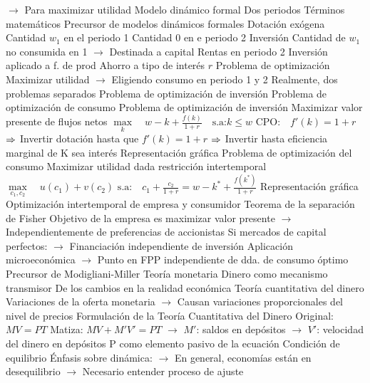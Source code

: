 \documentclass{nuevotema}
\begin{document}
\begin{esquemal}
				\4[] $\to$ Para maximizar utilidad
				\4 Modelo dinámico formal
				\4[] Dos periodos
				\4[] Términos matemáticos
				\4 Precursor de modelos dinámicos formales
				\4 Dotación exógena
				\4[] Cantidad $w_1$ en el periodo 1
				\4[] Cantidad 0 en e periodo 2
				\4 Inversión
				\4[] Cantidad de $w_1$ no consumida en 1
				\4[] $\to$ Destinada a capital
				\4 Rentas en periodo 2
				\4[] Inversión aplicado a f. de prod
				\4[] Ahorro a tipo de interés $r$
				\4 Problema de optimización
				\4[] Maximizar utilidad
				\4[] $\to$ Eligiendo consumo en periodo 1 y 2
				\4 Realmente, dos problemas separados
				\4[I] Problema de optimización de inversión
				\4[II] Problema de optimización de consumo
				\4 Problema de optimización de inversión
				\4[] Maximizar valor presente de flujos netos
				\4[] $\underset{k}{\max} \quad w-k + \frac{f(k)}{1+r} \quad \text{s.a:} k \leq w$
				\4[] $\text{CPO:} \quad f'(k) = 1+r$
				\4[] $\then$ Invertir dotación hasta que $f'(k) = 1+r$
				\4[] $\then$ Invertir hasta eficiencia marginal de K sea interés
				\4[] Representación gráfica
				\4[] 
				\4 Problema de optimización del consumo
				\4[] Maximizar utilidad dada restricción intertemporal
				\4[] $\underset{c_1, c_2}{\max} \quad u(c_1) + v(c_2)$
				\4[] $\text{s.a:} \quad c_1 + \frac{c_2}{1+r} = w -k^* + \frac{f(k^*)}{1+r}$
				\4[] Representación gráfica
				\4[] 
				\4 Optimización intertemporal de empresa y consumidor
				\4[$\then$] Teorema de la separación de Fisher
				\4[] Objetivo de la empresa es maximizar valor presente
				\4[] $\to$ Independientemente de preferencias de accionistas
				\4[] Si mercados de capital perfectos:
				\4[] $\to$ Financiación independiente de inversión
				\4[] Aplicación microeconómica
				\4[] $\to$ Punto en FPP independiente de dda. de consumo óptimo
				\4[] Precursor de Modigliani-Miller
			\3 Teoría monetaria
				\4 Dinero como mecanismo transmisor
				\4[] De los cambios en la realidad económica
				\4 Teoría cuantitativa del dinero
				\4[] Variaciones de la oferta monetaria
				\4[] $\to$ Causan variaciones proporcionales del nivel de precios
				\4 Formulación de la Teoría Cuantitativa del Dinero
				\4[] Original: $MV = PT$
				\4[] Matiza: $MV + M'V' = PT$
				\4[] $\to$ $M'$: saldos en depósitos
				\4[] $\to$ $V'$: velocidad del dinero en depósitos
				\4[] P como elemento pasivo de la ecuación
				\4[] Condición de equilibrio
				\4[] Énfasis sobre dinámica:
				\4[] $\to$ En general, economías están en desequilibrio
				\4[] $\to$ Necesario entender proceso de ajuste

\end{esquemal}
\end{document}
